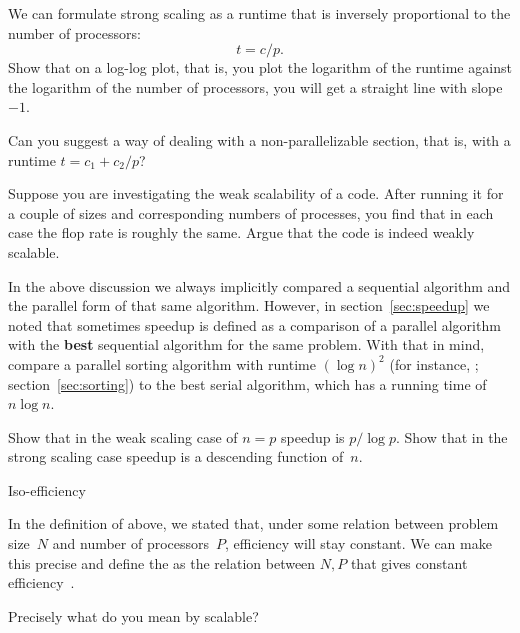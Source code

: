 \begin{exercise}
  We can formulate strong scaling as a runtime that is inversely
  proportional to the number of processors: \[ t=c/p. \]
  Show that on a log-log plot, that is, you plot the logarithm of the
  runtime against the logarithm of the number of processors,
  you will get a straight line with slope~$-1$.

  Can you suggest a way of dealing with a non-parallelizable
  section, that is, with a runtime $t=c_1+c_2/p$?
\end{exercise}

\begin{exercise}
  Suppose you are investigating the weak scalability of a code.
  After running it for a couple of sizes and corresponding numbers
  of processes, you find that in each case the flop rate is roughly the same.
  Argue that the code is indeed weakly scalable.
\end{exercise}

\begin{exercise}
  In the above discussion we always implicitly compared a sequential 
  algorithm and the parallel form of that same algorithm. However, 
  in section~\ref{sec:speedup} we noted that sometimes speedup is defined
  as a comparison of a parallel algorithm with the \textbf{best} sequential
  algorithm for the same problem. With that in mind, compare a parallel sorting
  algorithm with runtime $(\log n)^2$ (for instance, ;
  section~\ref{sec:sorting}) to the best serial algorithm, which has 
  a running time of $n\log n$.

  Show that in the weak scaling case of $n=p$ speedup is $p/\log p$.
  Show that in the strong scaling case speedup is a descending function of~$n$.
\end{exercise}

 {Iso-efficiency}
\label{sec:iso-efficiency}

In the definition of  above, we stated
that, under some relation between problem size~$N$ and number of
processors~$P$, efficiency will stay constant. We can make this
precise and define the  as the
relation between $N,P$ that gives constant
efficiency~\cite{Grama:1993:isoefficiency}.

 {Precisely what do you mean by scalable?}

